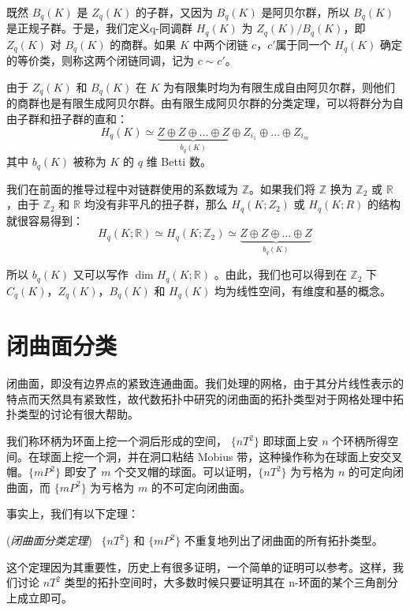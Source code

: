 既然 $ B_q(K) $ 是 $ Z_q(K) $ 的子群，又因为 $ B_q(K) $ 是阿贝尔群，所以 $ B_q(K) $ 是正规子群。于是，我们定义q-同调群 $ H_q(K) $ 为 $ Z_q(K) / B_q(K) $，即 $ Z_q(K) $ 对 $ B_q(K) $ 的商群。如果 $ K $ 中两个闭链 $ c $，$ c' $属于同一个 $ H_q(K) $ 确定的等价类，则称这两个闭链同调，记为 $ c \sim c' $。

由于 $ Z_q(K) $ 和 $ B_q(K) $ 在 $ K $ 为有限集时均为有限生成自由阿贝尔群，则他们的商群也是有限生成阿贝尔群。由有限生成阿贝尔群的分类定理，可以将群分为自由子群和扭子群的直和：
$$
H_q(K) \simeq \underbrace{Z \oplus Z \oplus \dots \oplus Z}_{b_q(K)} \oplus Z_{i_1} \oplus \dots \oplus Z_{i_m}
$$
其中 $ b_q(K) $ 被称为 $ K $ 的 $ q $ 维 Betti 数。

我们在前面的推导过程中对链群使用的系数域为 $ \mathbb Z $。如果我们将 $ \mathbb{Z} $ 换为 $ \mathbb{Z}_2 $ 或 $ \mathbb{R} $，由于 $ \mathbb{Z}_2 $ 和 $ \mathbb{R} $ 均没有非平凡的扭子群，那么 $ H_q(K; Z_2) $ 或 $ H_q(K; R) $ 的结构就很容易得到：
$$
H_q(K;\mathbb{R}) \simeq H_q(K;\mathbb{Z}_2) \simeq\underbrace{Z \oplus Z \oplus \dots \oplus Z}_{b_q(K)}
$$

所以 $ b_q(K) $ 又可以写作 $ \dim H_q(K; \mathbb{R}) $ 。由此，我们也可以得到在 $ \mathbb{Z}_2 $ 下 $ C_q(K) $，$ Z_q(K) $，$ B_q(K) $ 和 $ H_q(K) $ 均为线性空间，有维度和基的概念。

\section{闭曲面分类}

闭曲面，即没有边界点的紧致连通曲面。我们处理的网格，由于其分片线性表示的特点而天然具有紧致性，故代数拓扑中研究的闭曲面的拓扑类型对于网格处理中拓扑类型的讨论有很大帮助。

我们称环柄为环面上挖一个洞后形成的空间， $ \{nT^2\} $ 即球面上安 $ n $ 个环柄所得空间。在球面上挖一个洞，并在洞口粘结 Mobius 带，这种操作称为在球面上安交叉帽。$ \{mP^2\} $ 即安了 $ m $ 个交叉帽的球面。可以证明，$ \{nT^2\} $ 为亏格为 $ n $ 的可定向闭曲面，而 $ \{mP^2\} $ 为亏格为 $ m $ 的不可定向闭曲面。

事实上，我们有以下定理：

\begin{theorem}
    (\emph{闭曲面分类定理})~
    $ \{nT^2 \} $ 和 $ \{mP^2\} $ 不重复地列出了闭曲面的所有拓扑类型。
\end{theorem}

这个定理因为其重要性，历史上有很多证明，一个简单的证明可以参考\cite{jctpxjy}。这样，我们讨论 $ nT^2 $ 类型的拓扑空间时，大多数时候只要证明其在 n-环面的某个三角剖分上成立即可。

